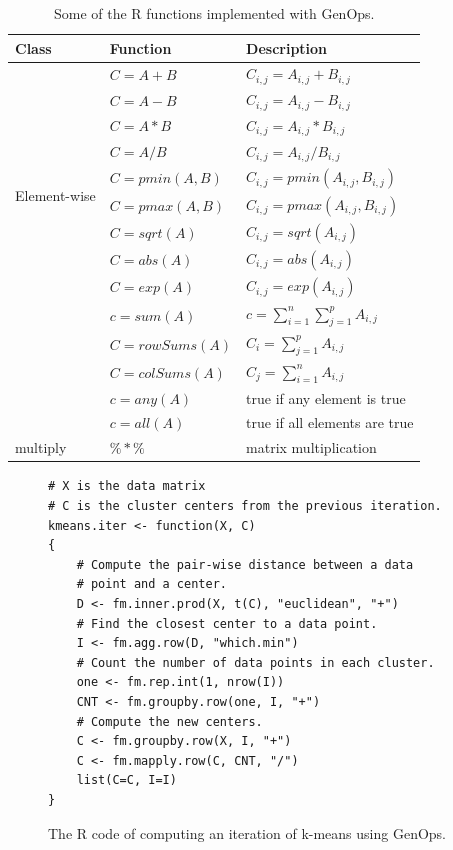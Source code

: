 \begin{table}
\begin{center}
\footnotesize
\begin{tabular}{|l|l|l|}
\hline
Class & Function & Description \\
\hline
\multirow{10}{*}{Element-wise} & $C=A+B$ & $C_{i,j}=A_{i,j} + B_{i,j}$ \\
& $C=A-B$ & $C_{i,j}=A_{i,j} - B_{i,j}$ \\
& $C=A*B$ & $C_{i,j}=A_{i,j} * B_{i,j}$ \\
& $C=A/B$ & $C_{i,j}=A_{i,j} / B_{i,j}$ \\
& $C=pmin(A,B)$ & $C_{i,j}=pmin(A_{i,j}, B_{i,j})$ \\
& $C=pmax(A,B)$ & $C_{i,j}=pmax(A_{i,j}, B_{i,j})$ \\
& $C=sqrt(A)$ & $C_{i,j}=sqrt(A_{i,j})$ \\
& $C=abs(A)$ & $C_{i,j}=abs(A_{i,j})$ \\
& $C=exp(A)$ & $C_{i,j}=exp(A_{i,j})$ \\
\hline
\multirow{5}{*}{Aggregate} & $c=sum(A)$ & $c=\sum\limits_{i=1}^{n} \sum\limits_{j=1}^{p}A_{i,j}$ \\
& $C=rowSums(A)$ & $C_i=\sum\limits_{j=1}^{p} A_{i,j}$ \\
& $C=colSums(A)$ & $C_j=\sum\limits_{i=1}^{n} A_{i,j}$ \\
& $c=any(A)$ & true if any element is true \\
& $c=all(A)$ & true if all elements are true \\
\hline
\multirow{1}{*}{multiply} & $\%*\%$ & matrix multiplication \\
\hline
\end{tabular}
\normalsize
\end{center}
\caption{Some of the R functions implemented with GenOps.}
\label{tbl:Rfuns}
\end{table}

\begin{figure}[t]
\begin{verbatim}
# X is the data matrix
# C is the cluster centers from the previous iteration.
kmeans.iter <- function(X, C)
{
	# Compute the pair-wise distance between a data
	# point and a center.
	D <- fm.inner.prod(X, t(C), "euclidean", "+")
	# Find the closest center to a data point.
	I <- fm.agg.row(D, "which.min")
	# Count the number of data points in each cluster.
	one <- fm.rep.int(1, nrow(I))
	CNT <- fm.groupby.row(one, I, "+")
	# Compute the new centers.
	C <- fm.groupby.row(X, I, "+")
	C <- fm.mapply.row(C, CNT, "/")
	list(C=C, I=I)
}
\end{verbatim}
\vspace{-5pt}
\caption{The R code of computing an iteration of k-means using GenOps.}
\label{fig:kmeans}
\end{figure}

